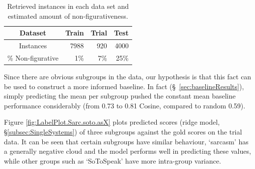 \documentclass[11pt,letterpaper]{article}
\begin{document}
\begin{table}[ht!]
\begin{center}
\begin{tabular}{|c|r|r|r|}
\hline
Dataset&Train&Trial&Test\\
\hline
Instances&7988&920&4000\\
\% Non-figurative&1\%&7\%&25\%\\
\hline
\end{tabular}
\end{center}
\caption{Retrieved instances in each data set and estimated amount of non-figurativeness.}
\label{tbl:dataamount}
\end{table}


Since there are obvious subgroups in the data, our hypothesis is that this fact can be used to construct a more informed baseline. In fact (\S~\ref{sec:baselineResults}), simply predicting the mean per subgroup pushed the constant mean baseline performance considerably (from 0.73 to 0.81 Cosine, compared to random 0.59). 

Figure \ref{fig:LabelPlot.Sarc.soto.asX} plots predicted scores (ridge model, \S\ref{subsec:SingleSystems}) of three subgroups against the gold scores on the trial data. It can be seen that certain subgroups have similar behaviour, `sarcasm' has a generally negative cloud and the model performs well in predicting these values, while other groups such as `SoToSpeak' have more intra-group variance. %




\begin{table}[ht!]
\caption{Tweet Label Type and Expression.}
\label{tbl:tweettype}
\end{table}
\end{document}
